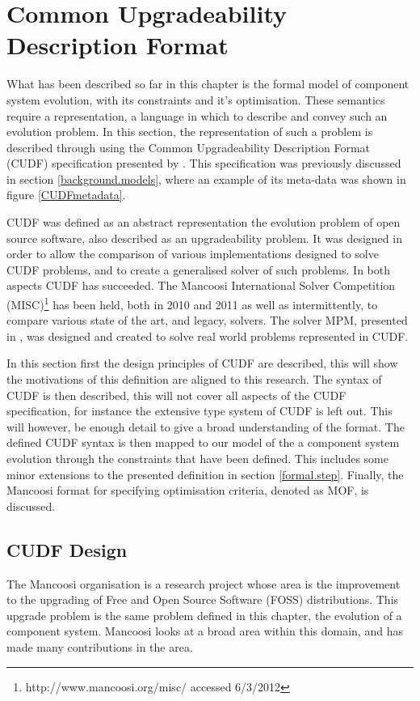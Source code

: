 \section{Common Upgradeability Description Format}
\label{formal.cudf}
What has been described so far in this chapter is the formal model of component system evolution, with its constraints and it's optimisation.
These semantics require a representation, a language in which to describe and convey such an evolution problem.
In this section, the representation of such a problem is described through using the Common Upgradeability Description Format (CUDF) specification presented by \citep{treinen2009common}.
This specification was previously discussed in section \ref{background.models}, where an example of its meta-data was shown in figure \ref{CUDFmetadata}.

CUDF was defined as an abstract representation the evolution problem of open source software, also described as an upgradeability problem.
It was designed in order to allow the comparison of various implementations designed to solve CUDF problems, 
and to create a generalised solver of such problems.
In both aspects CUDF has succeeded.
The Mancoosi International Solver Competition (MISC)\footnote{http://www.mancoosi.org/misc/ accessed 6/3/2012} has been held, both in 2010 and 2011 as well as intermittently, 
to compare various state of the art, and legacy, solvers.
The solver MPM, presented in \citep{abate2011}, was designed and created to solve real world problems represented in CUDF.

In this section first the design principles of CUDF are described, this will show the motivations of this definition are aligned to this research.
The syntax of CUDF is then described, this will not cover all aspects of the CUDF specification, for instance the extensive type system of CUDF is left out.
This will however, be enough detail to give a broad understanding of the format.
The defined CUDF syntax is then mapped to our model of the a component system evolution through the constraints that have been defined.
This includes some minor extensions to the presented definition in section \ref{formal.step}.
Finally, the Mancoosi format for specifying optimisation criteria, denoted as MOF, is discussed.

\subsection{CUDF Design}
The Mancoosi organisation is a research project whose area is the improvement to the upgrading of Free and Open Source Software (FOSS) distributions.
This upgrade problem is the same problem defined in this chapter, the evolution of a component system.
Mancoosi looks at a broad area within this domain, and has made many contributions in the area.

